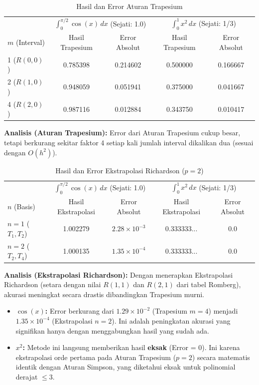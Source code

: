 \documentclass[a4paper, 11pt]{article} %
\begin{document}
\begin{table}[H] %
\centering %
\caption{Hasil dan Error Aturan Trapesium} %
\begin{tabular}{l c c c c} %
\toprule %
 & \multicolumn{2}{c}{$\int_0^{\pi/2} \cos(x) \, dx$ (Sejati: 1.0)} & \multicolumn{2}{c}{$\int_0^1 x^2 \, dx$ (Sejati: 1/3)} \\ %
$m$ (Interval) & Hasil Trapesium & Error Absolut & Hasil Trapesium & Error Absolut \\ %
\midrule %
1 ($R(0,0)$) & 0.785398 & %
0.214602 & 0.500000 & 0.166667 \\ %
2 ($R(1,0)$) & 0.948059 & 0.051941 & 0.375000 & 0.041667 \\ %
4 ($R(2,0)$) & 0.987116 & 0.012884 & 0.343750 & 0.010417 \\ %
\bottomrule %
\end{tabular} %
\end{table} %

\textbf{Analisis (Aturan Trapesium):} Error dari Aturan Trapesium cukup besar, tetapi berkurang sekitar faktor 4 setiap kali jumlah interval dikalikan dua (sesuai dengan $O(h^2)$). %

\begin{table}[H] 
\centering 
\caption{Hasil dan Error Ekstrapolasi Richardson ($p=2$)} 
\begin{tabular}{l c c c c} 
\toprule 
 & \multicolumn{2}{c}{$\int_0^{\pi/2} \cos(x) \, dx$ (Sejati: 1.0)} & \multicolumn{2}{c}{$\int_0^1 x^2 \, dx$ (Sejati: 1/3)} \\ 
$n$ (Basis) & Hasil Ekstrapolasi & Error Absolut & Hasil Ekstrapolasi & Error Absolut \\ 
\midrule 
$n=1$ ($T_1, T_2$) & 1.002279 & $2.28 \times 10^{-3}$ & 0.333333... & 0.0 \\ 
$n=2$ ($T_2, T_4$) & 1.000135 & $1.35 \times 10^{-4}$ & 0.333333... & 0.0 \\ 
\bottomrule 
\end{tabular} 
\end{table} 

\textbf{Analisis (Ekstrapolasi Richardson):} Dengan menerapkan Ekstrapolasi Richardson (setara dengan nilai $R(1,1)$ dan $R(2,1)$ dari tabel Romberg), akurasi meningkat secara drastis dibandingkan Trapesium murni.
\begin{itemize}
    \item \textbf{$\cos(x)$:} Error berkurang dari $1.29 \times 10^{-2}$ (Trapesium $m=4$) menjadi $1.35 \times 10^{-4}$ (Ekstrapolasi $n=2$). Ini adalah peningkatan akurasi yang signifikan hanya dengan menggabungkan hasil yang sudah ada.
    \item \textbf{$x^2$:} Metode ini langsung memberikan hasil \textbf{eksak} (Error = 0). Ini karena ekstrapolasi orde pertama pada Aturan Trapesium ($p=2$) secara matematis identik dengan Aturan Simpson, yang diketahui eksak untuk polinomial derajat $\le 3$.
\end{itemize}
\end{document}

